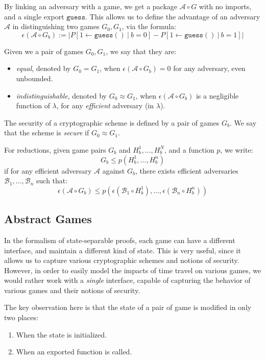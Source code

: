 By linking an adversary with a game, we get a package $\mathcal{A} \circ G$
with no imports, and a single export $\texttt{guess}$.
This allows us to define the advantage of an adversary $\mathcal{A}$
in distinguishing two games $G_0, G_1$, via the formula:
$$
\epsilon(\mathcal{A} \circ G_b) := \left|P[1 \gets \texttt{guess}()\ |\ b = 0] - P[1 \gets \texttt{guess}() \ |\ b = 1]\right|
$$

Given we a pair of games $G_0, G_1$, we say that they are:

\begin{itemize}
    \item \emph{equal}, denoted by $G_0 = G_1$, when $\epsilon(\mathcal{A} \circ G_b) = 0$ for any adversary, even unbounded.
    \item \emph{indistinguishable}, denoted by $G_0 \approx G_1$, when $\epsilon(\mathcal{A} \circ G_b)$ is a negligible function of $\lambda$, for any \emph{efficient} adversary (in $\lambda$).
\end{itemize}

The security of a cryptographic scheme is defined by a pair of games $G_b$.
We say that the scheme is \emph{secure} if $G_0 \approx G_1$.

For reductions, given game pairs $G_b$ and $H_b^1, \ldots, H_b^N$,
and a function $p$, we write:
$$
G_b \leq p(H_b^1, \ldots, H_b^n)
$$
if for any efficient adversary $\mathcal{A}$ against $G_b$, there exists efficient
adversaries $\mathcal{B}_1, \ldots, \mathcal{B}_n$ such that:
$$
\epsilon(\mathcal{A} \circ G_b) \leq p(\epsilon(\mathcal{B}_1 \circ H_b^1), \ldots, \epsilon(\mathcal{B}_n \circ H_b^n))
$$

\subsection{Abstract Games}

In the formalism of state-separable proofs, each game can have a different interface,
and maintain a different kind of state.
This is very useful, since it allows us to capture various cryptographic schemes
and notions of security.
However, in order to easily model the impacts of time travel on various games,
we would rather work with a \emph{single} interface, capable of capturing the behavior
of various games and their notions of security.

The key observation here is that the state of a pair of game is modified in only two places:

\begin{enumerate}
    \item When the state is initialized.
    \item When an exported function is called.
\end{enumerate}

